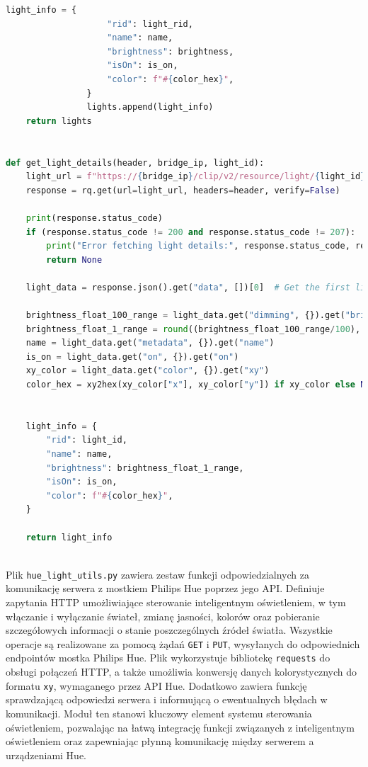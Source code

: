 \documentclass[12pt]{article}
\begin{document}
\begin{lstlisting}[language=Python]
                light_info = {
                    "rid": light_rid,
                    "name": name,
                    "brightness": brightness,
                    "isOn": is_on,
                    "color": f"#{color_hex}",
                }
                lights.append(light_info)
    return lights


def get_light_details(header, bridge_ip, light_id):
    light_url = f"https://{bridge_ip}/clip/v2/resource/light/{light_id}"
    response = rq.get(url=light_url, headers=header, verify=False)
    
    print(response.status_code)
    if (response.status_code != 200 and response.status_code != 207):
        print("Error fetching light details:", response.status_code, response.text)
        return None

    light_data = response.json().get("data", [])[0]  # Get the first light data object
    
    brightness_float_100_range = light_data.get("dimming", {}).get("brightness")
    brightness_float_1_range = round((brightness_float_100_range/100), 2)
    name = light_data.get("metadata", {}).get("name")
    is_on = light_data.get("on", {}).get("on")
    xy_color = light_data.get("color", {}).get("xy")
    color_hex = xy2hex(xy_color["x"], xy_color["y"]) if xy_color else None


    light_info = {
        "rid": light_id,
        "name": name,
        "brightness": brightness_float_1_range,
        "isOn": is_on,
        "color": f"#{color_hex}",
    }

    return light_info
    
\end{lstlisting}
Plik \texttt{hue\_light\_utils.py} zawiera zestaw funkcji odpowiedzialnych za komunikację serwera z mostkiem Philips Hue poprzez jego API. Definiuje zapytania HTTP umożliwiające sterowanie
inteligentnym oświetleniem, w tym włączanie i wyłączanie świateł, zmianę jasności, kolorów oraz pobieranie szczegółowych informacji o stanie poszczególnych źródeł światła. Wszystkie operacje są
realizowane za pomocą żądań \texttt{GET} i \texttt{PUT}, wysyłanych do odpowiednich endpointów mostka Philips Hue. Plik wykorzystuje bibliotekę \texttt{requests} do obsługi połączeń HTTP, a
także umożliwia konwersję danych kolorystycznych do formatu \texttt{xy}, wymaganego przez API Hue. Dodatkowo zawiera funkcję sprawdzającą odpowiedzi serwera i informującą o ewentualnych błędach
w komunikacji. Moduł ten stanowi kluczowy element systemu sterowania oświetleniem, pozwalając na łatwą integrację funkcji związanych z inteligentnym oświetleniem oraz zapewniając płynną komunikację
między serwerem a urządzeniami Hue.
\end{document}
